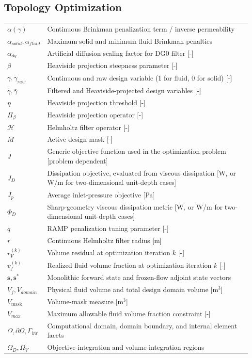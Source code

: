 \documentclass[master=ewtk,masteroption=,openany]{kulemt}
\begin{document}
\subsection*{Topology Optimization}
\begin{flushleft}
	\renewcommand{\arraystretch}{1.1}
	\begin{tabularx}{\textwidth}{@{}p{25mm}X@{}}
		$\alpha(\gamma)$ & Continuous Brinkman penalization term / inverse permeability \\
		$\alpha_{solid}, \alpha_{fluid}$ & Maximum solid and minimum fluid Brinkman penalties \\
		$\alpha_{dg}$ & Artificial diffusion scaling factor for DG0 filter [-] \\
		$\beta$ & Heaviside projection steepness parameter [-] \\
		$\gamma, \gamma_{raw}$ & Continuous and raw design variable (1 for fluid, 0 for solid) [-] \\
		$\tilde{\gamma}, \bar{\gamma}$ & Filtered and Heaviside-projected design variables [-] \\
		$\eta$ & Heaviside projection threshold [-] \\
		$\Pi_\beta$ & Heaviside projection operator [-] \\
		$\mathcal{H}$ & Helmholtz filter operator [-] \\
		$M$ & Active design mask [-] \\
		$J$ & Generic objective function used in the optimization problem [problem dependent] \\
		$J_D$ & Dissipation objective, evaluated from viscous dissipation [W, or W/m for two-dimensional unit-depth cases] \\
		$J_p$ & Average inlet-pressure objective [Pa] \\
		$\Phi_D$ & Sharp-geometry viscous dissipation metric [W, or W/m for two-dimensional unit-depth cases] \\
		$q$ & RAMP penalization tuning parameter [-] \\
		$r$ & Continuous Helmholtz filter radius [m] \\
		$r_V^{(k)}$ & Volume residual at optimization iteration $k$ [-] \\
		$v_f^{(k)}$ & Realized fluid volume fraction at optimization iteration $k$ [-] \\
		$\mathbf{s}, \mathbf{s}^*$ & Monolithic forward state and frozen-flow adjoint state vectors \\
		$V_f, V_{domain}$ & Physical fluid volume and total design domain volume [m$^3$] \\
		$V_{\mathrm{mask}}$ & Volume-mask measure [m$^3$] \\
		$V_{max}$ & Maximum allowable fluid volume fraction constraint [-] \\
		$\Omega, \partial\Omega, \Gamma_{int}$ & Computational domain, domain boundary, and internal element facets \\
		$\Omega_D, \Omega_V$ & Objective-integration and volume-integration regions \\
	\end{tabularx}
\end{flushleft}
\end{document}
